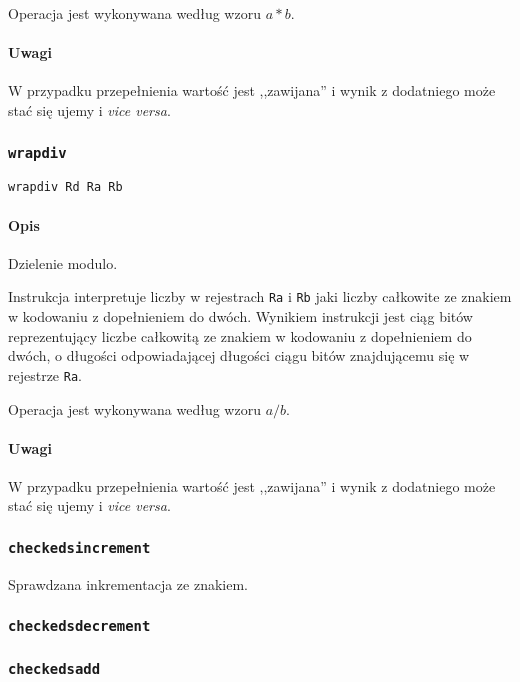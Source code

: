 Operacja jest wykonywana według wzoru $a * b$.

\paragraph*{Uwagi}

W przypadku przepełnienia wartość jest ,,zawijana'' i wynik z dodatniego może
stać się ujemy i \emph{vice versa}.

\subsubsection{\texttt{wrapdiv}}

\begin{lstlisting}
wrapdiv Rd Ra Rb
\end{lstlisting}

\paragraph*{Opis} Dzielenie modulo.

Instrukcja interpretuje liczby w rejestrach \texttt{Ra} i \texttt{Rb} jaki
liczby całkowite ze znakiem w kodowaniu z dopełnieniem do dwóch. Wynikiem
instrukcji jest ciąg bitów reprezentujący liczbe całkowitą ze znakiem w
kodowaniu z dopełnieniem do dwóch, o długości odpowiadającej długości ciągu
bitów znajdującemu się w rejestrze \texttt{Ra}.

Operacja jest wykonywana według wzoru $a / b$.

\paragraph*{Uwagi}

W przypadku przepełnienia wartość jest ,,zawijana'' i wynik z dodatniego może
stać się ujemy i \emph{vice versa}.

\subsubsection{\texttt{checkedsincrement}}

Sprawdzana inkrementacja ze znakiem.

\subsubsection{\texttt{checkedsdecrement}}
\subsubsection{\texttt{checkedsadd}}
